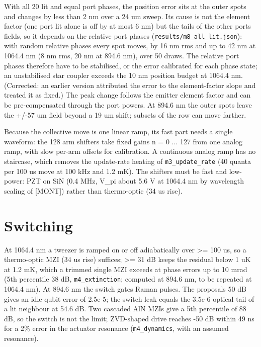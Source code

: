 With all 20 lit and equal port phases, the position error sits at the
outer spots and changes by less than 2 nm over a 24 um sweep. Its cause
is not the element factor (one port lit alone is off by at most 6 nm)
but the tails of the other ports\textquotesingle{} fields, so it depends
on the relative port phases (\texttt{results/m8\_all\_lit.json}): with
random relative phases every spot moves, by 16 nm rms and up to 42 nm at
1064.4 nm (8 nm rms, 20 nm at 894.6 nm), over 50 draws. The relative
port phases therefore have to be stabilised, or the error calibrated for
each phase state; an unstabilised star coupler exceeds the 10 nm
position budget at 1064.4 nm. (Corrected: an earlier version attributed
the error to the element-factor slope and treated it as fixed.) The peak
change follows the emitter element factor and can be pre-compensated
through the port powers. At 894.6 nm the outer spots leave the +/-57 um
field beyond a 19 um shift; subsets of the row can move farther.

Because the collective move is one linear ramp, its fast part needs a
single waveform: the 128 arm shifters take fixed gains n = 0 ... 127
from one analog ramp, with slow per-arm offsets for calibration. A
continuous analog ramp has no staircase, which removes the update-rate
heating of \texttt{m3\_update\_rate} (40 quanta per 100 us move at 100
kHz and 1.2 mK). The shifters must be fast and low-power: PZT on SiN
(0.4 MHz, V\_pi about 5.6 V at 1064.4 nm by wavelength scaling of
{[}MONT{]}) rather than thermo-optic (34 us rise).

\hypertarget{6-switching}{%
\section{Switching}\label{twenty_tweezers-6-switching}}

At 1064.4 nm a tweezer is ramped on or off adiabatically over
\textgreater= 100 us, so a thermo-optic MZI (34 us rise) suffices;
\textgreater= 31 dB keeps the residual below 1 uK at 1.2 mK, which a
trimmed single MZI exceeds at phase errors up to 10 mrad (5th percentile
38 dB, \texttt{m4\_extinction}; computed at 894.6 nm, to be repeated at
1064.4 nm). At 894.6 nm the switch gates Raman pulses. The
proposal\textquotesingle s 50 dB gives an idle-qubit error of 2.5e-5;
the switch leak equals the 3.5e-6 optical tail of a lit neighbour at
54.6 dB. Two cascaded AlN MZIs give a 5th percentile of 88 dB, so the
switch is not the limit; ZVD-shaped drive reaches -50 dB within 49 ns
for a 2\% error in the actuator resonance (\texttt{m4\_dynamics}, with
an assumed resonance).

